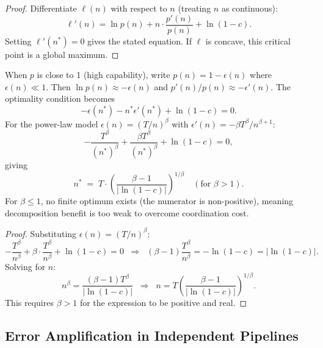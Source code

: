 \begin{proof}
Differentiate $\ell(n)$ with respect to $n$ (treating $n$ as continuous):
\[
  \ell'(n) = \ln p(n) + n \cdot \frac{p'(n)}{p(n)} + \ln(1-c).
\]
Setting $\ell'(n^*) = 0$ gives the stated equation. If $\ell$ is concave, this
critical point is a global maximum.
\end{proof}

\begin{corollary}
\label{cor:optimal-approx}
When $p$ is close to 1 (high capability), write $p(n) = 1 - \epsilon(n)$ where
$\epsilon(n) \ll 1$. Then $\ln p(n) \approx -\epsilon(n)$ and $p'(n)/p(n) \approx
-\epsilon'(n)$. The optimality condition becomes
\[
  -\epsilon(n^*) - n^* \epsilon'(n^*) + \ln(1-c) = 0.
\]
For the power-law model $\epsilon(n) = (T/n)^\beta$ with $\epsilon'(n) =
-\beta T^\beta / n^{\beta+1}$:
\[
  -\frac{T^\beta}{(n^*)^\beta} + \frac{\beta T^\beta}{(n^*)^\beta} + \ln(1-c) = 0,
\]
giving
\[
  \boxed{n^* \;=\; T \cdot \left(\frac{\beta - 1}{|\ln(1-c)|}\right)^{\!1/\beta}}
  \quad (\text{for } \beta > 1).
\]
For $\beta \leq 1$, no finite optimum exists (the numerator is non-positive), meaning
decomposition benefit is too weak to overcome coordination cost.
\end{corollary}

\begin{proof}
Substituting $\epsilon(n) = (T/n)^\beta$:
\[
  -\frac{T^\beta}{n^\beta} + \beta \cdot \frac{T^\beta}{n^\beta} + \ln(1-c) = 0
  \;\;\Longrightarrow\;\;
  (\beta - 1) \frac{T^\beta}{n^\beta} = -\ln(1-c) = |\ln(1-c)|.
\]
Solving for $n$:
\[
  n^\beta = \frac{(\beta-1) T^\beta}{|\ln(1-c)|}
  \;\;\Longrightarrow\;\;
  n = T \left(\frac{\beta-1}{|\ln(1-c)|}\right)^{1/\beta}.
\]
This requires $\beta > 1$ for the expression to be positive and real.
\end{proof}

\subsection{Error Amplification in Independent Pipelines}

